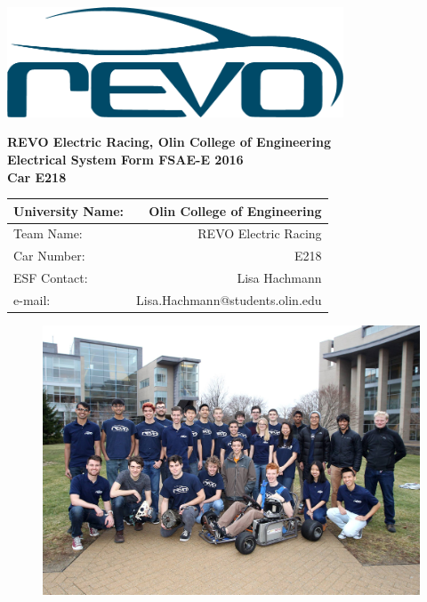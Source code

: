 \documentclass{article}
\begin{document}
\renewcommand{\headrulewidth}{0pt}
\chead{}
\rhead{\rightmark}
\rfoot{\thepage}

\begin{titlepage}

    \centering
    \vfill
    \includegraphics[width=10cm]{revo.png}

    {\bfseries\Large
        REVO Electric Racing, Olin College of Engineering\\
        \vskip2cm
        Electrical System Form FSAE-E 2016\\
        Car E218\\
    }

    \begin{table}[H]
        \centering
        \label{my-label}
        \begin{tabular}{lr}
        University Name: & Olin College of Engineering \\ \hline
        Team Name: & REVO Electric Racing \\ \hline
        Car Number: & E218 \\ \hline
        ESF Contact: & Lisa Hachmann \\ \hline
        e-mail: & Lisa.Hachmann@students.olin.edu \\ \hline
        \end{tabular}
    \end{table}
\vfill

\begin{figure}[H]
\centering
\includegraphics[width = 0.9 \textwidth]{teamPhoto}
\end{figure}

\end{titlepage}
\end{document}
